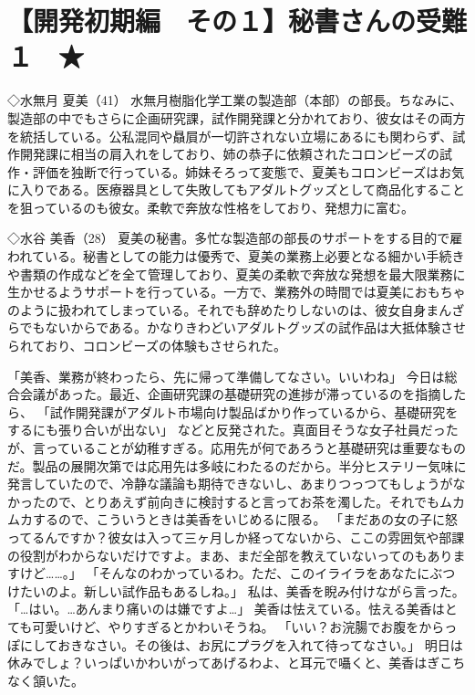 \section{【開発初期編　その１】秘書さんの受難１　★}

◇水無月 夏美（41）
水無月樹脂化学工業の製造部（本部）の部長。ちなみに、製造部の中でもさらに企画研究課，試作開発課と分かれており、彼女はその両方を統括している。公私混同や贔屓が一切許されない立場にあるにも関わらず、試作開発課に相当の肩入れをしており、姉の恭子に依頼されたコロンビーズの試作・評価を独断で行っている。姉妹そろって変態で、夏美もコロンビーズはお気に入りである。医療器具として失敗してもアダルトグッズとして商品化することを狙っているのも彼女。柔軟で奔放な性格をしており、発想力に富む。

◇水谷 美香（28）
夏美の秘書。多忙な製造部の部長のサポートをする目的で雇われている。秘書としての能力は優秀で、夏美の業務上必要となる細かい手続きや書類の作成などを全て管理しており、夏美の柔軟で奔放な発想を最大限業務に生かせるようサポートを行っている。一方で、業務外の時間では夏美におもちゃのように扱われてしまっている。それでも辞めたりしないのは、彼女自身まんざらでもないからである。かなりきわどいアダルトグッズの試作品は大抵体験させられており、コロンビーズの体験もさせられた。


「美香、業務が終わったら、先に帰って準備してなさい。いいわね」
今日は総合会議があった。最近、企画研究課の基礎研究の進捗が滞っているのを指摘したら、
「試作開発課がアダルト市場向け製品ばかり作っているから、基礎研究をするにも張り合いが出ない」
などと反発された。真面目そうな女子社員だったが、言っていることが幼稚すぎる。応用先が何であろうと基礎研究は重要なものだ。製品の展開次第では応用先は多岐にわたるのだから。半分ヒステリー気味に発言していたので、冷静な議論も期待できないし、あまりつっつてもしょうがなかったので、とりあえず前向きに検討すると言ってお茶を濁した。それでもムカムカするので、こういうときは美香をいじめるに限る。
「まだあの女の子に怒ってるんですか？彼女は入って三ヶ月しか経ってないから、ここの雰囲気や部課の役割がわからないだけですよ。まあ、まだ全部を教えていないってのもありますけど……。」
「そんなのわかっているわ。ただ、このイライラをあなたにぶつけたいのよ。新しい試作品もあるしね。」
私は、美香を睨み付けながら言った。
「…はい。…あんまり痛いのは嫌ですよ…」
美香は怯えている。怯える美香はとても可愛いけど、やりすぎるとかわいそうね。
「いい？お浣腸でお腹をからっぽにしておきなさい。その後は、お尻にプラグを入れて待ってなさい。」
明日は休みでしょ？いっぱいかわいがってあげるわよ、と耳元で囁くと、美香はぎこちなく頷いた。

